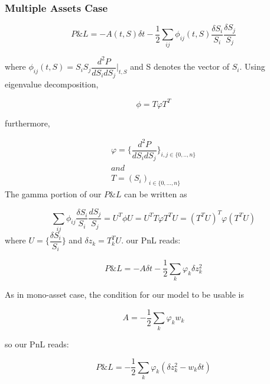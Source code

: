 \documentclass[a4]{article}
\begin{document}
\subsubsection{Multiple Assets Case}
\begin{equation}
P\&L = -A(t,S)\delta t - \frac{1}{2}\sum_{ij}\phi_{ij}(t,S)\dfrac{\delta S_{i}}{S_{i}}\dfrac{\delta S_{j}}{S_{j}}
\end{equation}\par 
where $\phi_{ij}(t,S) = S_{i}S_{j}\dfrac{d^{2}P}{dS_{i}dS_{j}}|_{t,S}$ and S denotes the vector of $S_{i}$. Using eigenvalue decomposition,\par 
\begin{equation}
\phi = T\mathcal{\varphi}T^{T}
\end{equation}\par 
furthermore, \par 
\begin{equation}
\begin{aligned}
\varphi = \{\dfrac{d^{2}P}{dS_{i}dS_{j}}\}_{i,j\in \{0,..,n\}}\\
and\\
T = (S_{i})_{i\in \{0,...,n\}}
\end{aligned}
\end{equation}
The gamma portion of our $P\&L$ can be written as\par 
\begin{equation}
\sum_{ij}\phi_{ij}\dfrac{\delta S_{i} }{S_{i}}\dfrac{dS_{j}}{S_{j}} = U^{T}\phi U = U^{T}T\varphi T^{T}U = (T^{T}U)^{T}\varphi (T^{T}U)
\end{equation}
where $U = \{\dfrac{\delta S_{i}}{S_{i}}\}$ and $\delta z_{k}=T_{k}^{T}U$. our PnL reads:\par 
\begin{equation}
P\&L = -A\delta t -\frac{1}{2}\sum_{k}\varphi_{k}\delta z_{k}^{2}
\end{equation}\par 
As in mono-asset case, the condition for our model to be usable is\par 
\begin{equation}	
A = -\frac{1}{2}\sum_{k}\varphi_{k}w_{k}
\end{equation}\par 
\noindent so our PnL reads:\par 
\begin{equation}
P\&L = -\frac{1}{2}\sum_{k}\varphi_{k}(\delta z_{k}^{2}-w_{k}\delta t)
\end{equation}\par 
\end{document}
